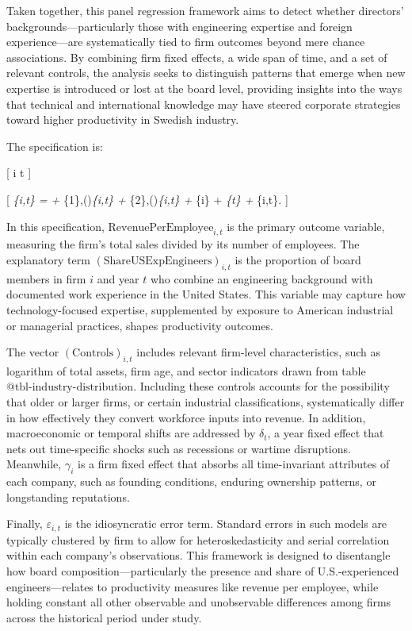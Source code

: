 \documentclass[
]{article}
\begin{document}
Taken together, this panel regression framework aims to detect whether
directors' backgrounds---particularly those with engineering expertise
and foreign experience---are systematically tied to firm outcomes beyond
mere chance associations. By combining firm fixed effects, a wide span
of time, and a set of relevant controls, the analysis seeks to
distinguish patterns that emerge when new expertise is introduced or
lost at the board level, providing insights into the ways that technical
and international knowledge may have steered corporate strategies toward
higher productivity in Swedish industry.

The specification is:

{[}  i  t
{]}

{[} \emph{\{i,t\} = \alpha +
\beta}\{1\},()\emph{\{i,t\} +
\beta}\{2\},()\emph{\{i,t\} + \gamma}\{i\} +
\delta\emph{\{t\} + \varepsilon}\{i,t\}. {]}

In this specification, \(\text{RevenuePerEmployee}_{i,t}\) is the
primary outcome variable, measuring the firm's total sales divided by
its number of employees. The explanatory term
\((\text{ShareUSExpEngineers})_{i,t}\) is the proportion of board
members in firm \(i\) and year \(t\) who combine an engineering
background with documented work experience in the United States. This
variable may capture how technology-focused expertise, supplemented by
exposure to American industrial or managerial practices, shapes
productivity outcomes.

The vector \((\text{Controls})_{i,t}\) includes relevant firm-level
characteristics, such as logarithm of total assets, firm age, and sector
indicators drawn from table \(\text{@tbl-industry-distribution}\).
Including these controls accounts for the possibility that older or
larger firms, or certain industrial classifications, systematically
differ in how effectively they convert workforce inputs into revenue. In
addition, macroeconomic or temporal shifts are addressed by
\(\delta_{t}\), a year fixed effect that nets out time-specific shocks
such as recessions or wartime disruptions. Meanwhile, \(\gamma_{i}\) is
a firm fixed effect that absorbs all time-invariant attributes of each
company, such as founding conditions, enduring ownership patterns, or
longstanding reputations.

Finally, \(\varepsilon_{i,t}\) is the idiosyncratic error term. Standard
errors in such models are typically clustered by firm to allow for
heteroskedasticity and serial correlation within each company's
observations. This framework is designed to disentangle how board
composition---particularly the presence and share of U.S.-experienced
engineers---relates to productivity measures like revenue per employee,
while holding constant all other observable and unobservable differences
among firms across the historical period under study.
\end{document}
